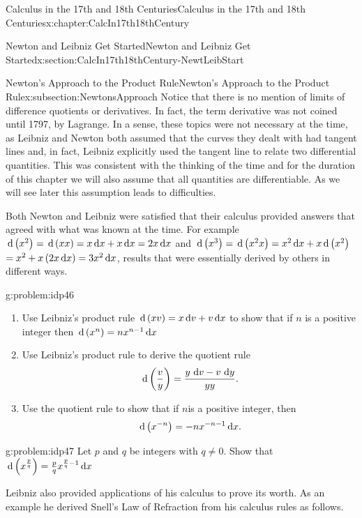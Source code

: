 \begin{chapterptx}{Calculus in the 17th and 18th Centuries}{}{Calculus in the 17th and 18th Centuries}{}{}{x:chapter:CalcIn17th18thCentury}
\begin{sectionptx}{Newton and Leibniz Get Started}{}{Newton and Leibniz Get Started}{}{}{x:section:CalcIn17th18thCentury-NewtLeibStart}
\begin{subsectionptx}{Newton's Approach to the Product Rule}{}{Newton's Approach to the Product Rule}{}{}{x:subsection:NewtonsApproach}
			 Notice that there is no mention of limits of difference quotients or derivatives.  In fact, the term derivative was not coined until 1797, by Lagrange.  In a sense, these topics were not necessary at the time, as Leibniz and Newton both assumed that the curves they dealt with had tangent lines and, in fact, Leibniz explicitly used the tangent line to relate two differential quantities.  This was consistent with the thinking of the time and for the duration of this chapter we will also assume that all quantities are differentiable.  As we will see later this assumption leads to difficulties.%
			\par
			Both Newton and Leibniz were satisfied that their calculus provided answers that agreed with what was known at the time.  For example \(\,{\rm d} \left(x^2\right)=\,{\rm d}\left(xx\right)=x\,{\rm d} x+x\,{\rm d} x=2x\,{\rm d} x\) and \(\,{\rm d}\left(x^3\right)=\,{\rm d}\left(x^2x\right)=x^2\,{\rm d} x+x\,{\rm d}\left(x^2\right)\) \(=x^2+x\left(2x\,{\rm d} x\right)=3x^2\,{\rm d} x\),\(\) results that were essentially derived by others in different ways.%
			\begin{problem}{}{g:problem:idp46}%
				\begin{enumerate}[font=\bfseries,label=(\alph*),ref=\alph*]
					\item{}Use Leibniz's product rule \(\,{\rm d} \left(xv\right)=x\,{\rm d} v+v\,{\rm d} x\) to show that if \(n\) is a positive integer then \(\,{\rm d} \left(x^n\right)=nx^{n-1}\,{\rm d} x\)%
					\item{}Use Leibniz's product rule to derive the quotient rule%
					\begin{equation*}
						\,{\rm d} \left(\frac{v}{y}\right)=\frac{y\,\,{\rm d} v-v\,\,{\rm d} y}{yy}\text{.}
					\end{equation*}
					\item{}Use the quotient rule to show that if \(n\)is a positive integer, then%
					\begin{equation*}
						\,{\rm d} \left(x^{-n}\right)=-nx^{-n-1}\,{\rm d} x.
					\end{equation*}
				\end{enumerate}
			\end{problem}
			\begin{problem}{}{g:problem:idp47}%
				 Let \(p\) and \(q\) be integers with \(q\neq 0\). Show that \(\,{\rm d} \left(x^{\frac{p}{q}}\right)=\frac{p}{q}x^{\frac{p}{q}-1}\,{\rm d} x\)%
			\end{problem}
			Leibniz also provided applications of his calculus to prove its worth. As an example he derived Snell's Law of Refraction from his calculus rules as follows.%

\end{subsectionptx}
\end{sectionptx}
\end{chapterptx}
